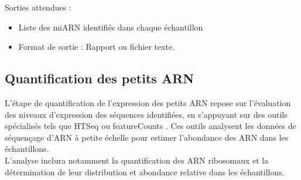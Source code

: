 \documentclass{report}
\begin{document}
\noindent Sorties attendues :
\begin{itemize}
    \item Liste des miARN identifiés dans chaque échantillon
    \item Format de sortie : Rapport ou fichier texte.
\end{itemize}

\subsection{Quantification des petits ARN }
L'étape de quantification de l'expression des petits ARN repose sur l'évaluation des niveaux d'expression des séquences identifiées, en s'appuyant sur des outils spécialisés tels que HTSeq\cite{anders2015htseq} ou featureCounts \cite{liao2014featurecounts}. Ces outils analysent les données de séquençage d'ARN à petite échelle pour estimer l'abondance des ARN dans les échantillons.\\

L'analyse inclura notamment la quantification des ARN ribosomaux et la détermination de leur distribution et abondance relative dans les échantillons.\\
\end{document}
